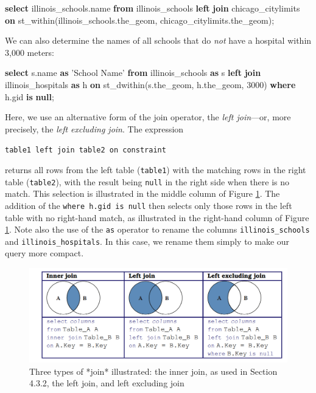 \documentclass[]{krantz}
\newenvironment{Shaded}{\begin{snugshade}}{\end{snugshade}}
\newcommand{\KeywordTok}[1]{\textcolor[rgb]{0.13,0.29,0.53}{\textbf{#1}}}
\newcommand{\DecValTok}[1]{\textcolor[rgb]{0.00,0.00,0.81}{#1}}
\newcommand{\StringTok}[1]{\textcolor[rgb]{0.31,0.60,0.02}{#1}}
\newcommand{\NormalTok}[1]{#1}
\begin{document}
\begin{Shaded}
\begin{Highlighting}[]
\KeywordTok{select}\NormalTok{ illinois_schools.name}
  \KeywordTok{from}\NormalTok{ illinois_schools }\KeywordTok{left} \KeywordTok{join}\NormalTok{ chicago_citylimits}
  \KeywordTok{on}\NormalTok{ st_within(illinois_schools.the_geom,}
\NormalTok{                  chicago_citylimits.the_geom);}
\end{Highlighting}
\end{Shaded}

We can also determine the names of all schools that do \emph{not} have a
hospital within 3,000 meters:

\begin{Shaded}
\begin{Highlighting}[]
\KeywordTok{select}\NormalTok{ s.name }\KeywordTok{as} \StringTok{'School Name'}
    \KeywordTok{from}\NormalTok{ illinois_schools }\KeywordTok{as}\NormalTok{ s}
        \KeywordTok{left} \KeywordTok{join}\NormalTok{ illinois_hospitals }\KeywordTok{as}\NormalTok{ h}
          \KeywordTok{on}\NormalTok{ st_dwithin(s.the_geom, h.the_geom, }\DecValTok{3000}\NormalTok{)}
    \KeywordTok{where}\NormalTok{ h.gid }\KeywordTok{is} \KeywordTok{null}\NormalTok{;}
\end{Highlighting}
\end{Shaded}

Here, we use an alternative form of the join operator, the \emph{left
join}---or, more precisely, the \emph{left excluding join}. The
expression

\texttt{table1\ left\ join\ table2\ on\ constraint}

returns all rows from the left table (\texttt{table1}) with the matching
rows in the right table (\texttt{table2}), with the result being
\texttt{null} in the right side when there is no match. This selection
is illustrated in the middle column of Figure \ref{fig:fig-venn}. The
addition of the \texttt{where\ h.gid\ is\ null} then selects only those
rows in the left table with no right-hand match, as illustrated in the
right-hand column of Figure \ref{fig:fig-venn}. Note also the use of the
\texttt{as} operator to rename the columns \texttt{illinois\_schools}
and \texttt{illinois\_hospitals}. In this case, we rename them simply to
make our query more compact.

\begin{figure}

{\centering \includegraphics[width=0.7\linewidth]{ChapterDB/figures/fig-venn} 

}

\caption{Three types of *join* illustrated: the inner join, as used in Section 4.3.2, the left join, and left excluding join}\label{fig:fig-venn}
\end{figure}
\end{document}
